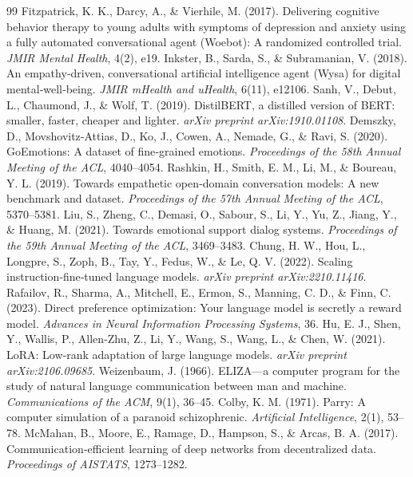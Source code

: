\documentclass[12pt,twoside]{article}
\begin{document}
\begin{thebibliography}{99}
 Fitzpatrick, K. K., Darcy, A., \& Vierhile, M. (2017). Delivering cognitive behavior therapy to young adults with symptoms of depression and anxiety using a fully automated conversational agent (Woebot): A randomized controlled trial. \textit{JMIR Mental Health}, 4(2), e19.
 Inkster, B., Sarda, S., \& Subramanian, V. (2018). An empathy‑driven, conversational artificial intelligence agent (Wysa) for digital mental‑well‑being. \textit{JMIR mHealth and uHealth}, 6(11), e12106.
 Sanh, V., Debut, L., Chaumond, J., \& Wolf, T. (2019). DistilBERT, a distilled version of BERT: smaller, faster, cheaper and lighter. \textit{arXiv preprint arXiv:1910.01108}.
 Demszky, D., Movshovitz‑Attias, D., Ko, J., Cowen, A., Nemade, G., \& Ravi, S. (2020). GoEmotions: A dataset of fine‑grained emotions. \textit{Proceedings of the 58th Annual Meeting of the ACL}, 4040–4054.
 Rashkin, H., Smith, E. M., Li, M., \& Boureau, Y. L. (2019). Towards empathetic open‑domain conversation models: A new benchmark and dataset. \textit{Proceedings of the 57th Annual Meeting of the ACL}, 5370–5381.
 Liu, S., Zheng, C., Demasi, O., Sabour, S., Li, Y., Yu, Z., Jiang, Y., \& Huang, M. (2021). Towards emotional support dialog systems. \textit{Proceedings of the 59th Annual Meeting of the ACL}, 3469–3483.
 Chung, H. W., Hou, L., Longpre, S., Zoph, B., Tay, Y., Fedus, W., \& Le, Q. V. (2022). Scaling instruction‑fine‑tuned language models. \textit{arXiv preprint arXiv:2210.11416}.
 Rafailov, R., Sharma, A., Mitchell, E., Ermon, S., Manning, C. D., \& Finn, C. (2023). Direct preference optimization: Your language model is secretly a reward model. \textit{Advances in Neural Information Processing Systems}, 36.
 Hu, E. J., Shen, Y., Wallis, P., Allen‑Zhu, Z., Li, Y., Wang, S., Wang, L., \& Chen, W. (2021). LoRA: Low‑rank adaptation of large language models. \textit{arXiv preprint arXiv:2106.09685}.
 Weizenbaum, J. (1966). ELIZA—a computer program for the study of natural language communication between man and machine. \textit{Communications of the ACM}, 9(1), 36–45.
 Colby, K. M. (1971). Parry: A computer simulation of a paranoid schizophrenic. \textit{Artificial Intelligence}, 2(1), 53–78.
 McMahan, B., Moore, E., Ramage, D., Hampson, S., \& Arcas, B. A. (2017). Communication‑efficient learning of deep networks from decentralized data. \textit{Proceedings of AISTATS}, 1273–1282.

\end{thebibliography}
\end{document}
